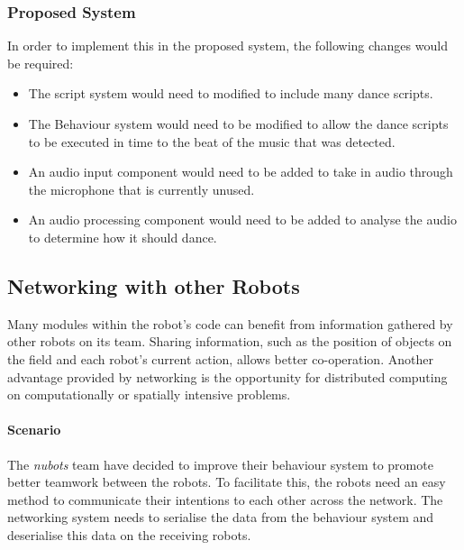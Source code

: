 \documentclass[english,12pt]{scrartcl}
\begin{document}
			\subsubsection{Proposed System}
				In order to implement this in the proposed system, the following changes would be required:
				\begin{itemize}
					\item The script system would need to modified to include many dance scripts.
					\item The Behaviour system would need to be modified to allow the dance scripts to be executed in time to the beat of the music that was detected.
					\item An audio input component would need to be added to take in audio through the microphone that is currently unused.
					\item An audio processing component would need to be added to analyse the audio to determine how it should dance.
				\end{itemize}

		\subsection{Networking with other Robots}
			Many modules within the robot’s code can benefit from information gathered by other robots on its team.
			Sharing information, such as the position of objects on the field and each robot’s current action, allows better co-operation.
			Another advantage provided by networking is the opportunity for distributed computing on computationally or spatially intensive problems.

			\paragraph{Scenario} The \emph{\gls{nubots}} team have decided to improve their behaviour system to promote better teamwork between the robots.
			To facilitate this, the robots need an easy method to communicate their intentions to each other across the network.
			The networking system needs to serialise the data from the behaviour system and deserialise this data on the receiving robots.
\end{document}
